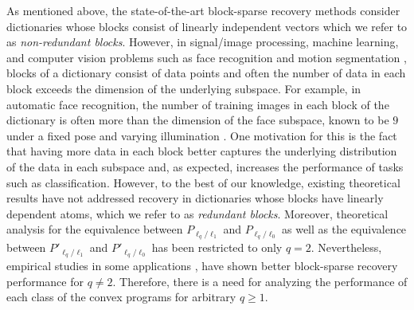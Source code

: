 \documentclass[10pt,twocolumn,twoside] {IEEEtran}
\begin{document}
\smallskip
As mentioned above, the state-of-the-art block-sparse recovery methods \cite{Stojnic:TSP09, Eldar:TSP10, Eldar:TIT09, Ganesh:ICASSP09, Boufounos:TIT11} consider dictionaries whose blocks consist of linearly independent vectors which we refer to as \emph{non-redundant blocks}. However, in signal/image processing, machine learning, and computer vision problems such as face recognition \cite{Wright:PAMI09, Elhamifar:CVPR11} and motion segmentation \cite{Elhamifar:CVPR09, Rao:CVPR08}, blocks of a dictionary consist of data points and often the number of data in each block exceeds the dimension of the underlying subspace. 
For example, in automatic face recognition, the number of training images in each block of the dictionary is often more than the dimension of the face subspace, known to be $9$ under a fixed pose and varying illumination \cite{Basri:PAMI03}. One motivation for this is the fact that having more data in each block better captures the underlying distribution of the data in each subspace and, as expected, increases the performance of tasks such as classification. However, to the best of our knowledge, existing theoretical results have not addressed recovery in dictionaries whose blocks have linearly dependent atoms, which we refer to as \emph{redundant blocks}. 
Moreover, theoretical analysis for the equivalence between $P_{\ell_q/\ell_1}$ and $P_{\ell_q/\ell_0}$ as well as the equivalence between $P'_{\ell_q/\ell_1}$ and $P'_{\ell_q/\ell_0}$ has been restricted to only $q=2$. Nevertheless, empirical studies in some applications \cite{Zhao:AnnalsStat09}, have shown better block-sparse recovery performance for $q \neq 2$. Therefore, there is a need for analyzing the performance of each class of the convex programs for arbitrary $q \geq 1$.
\end{document}
